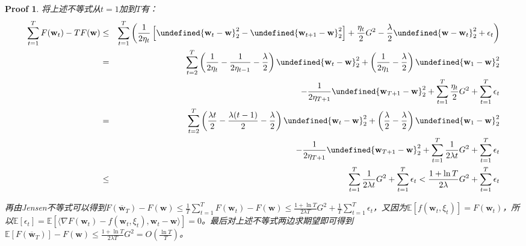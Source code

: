 \documentclass[a4paper,UTF8]{article}
\let\norm\undefined %
\DeclarePairedDelimiter\norm{\lVert}{\rVert}
\numberwithin{equation}{section}
\newtheorem*{myProof}{Proof}
\begin{document}
\begin{myProof}
将上述不等式从$t=1$加到$T$有：
\begin{eqnarray*}
\sum_{t=1}^T F(\mathbf{w}_t) - TF(\mathbf{w}) &\le& \sum_{t=1}^T \left( \frac{1}{2\eta_t} \left[ \norm{\mathbf{w}_t - \mathbf{w}}_2^2 - \norm{\mathbf{w}_{t+1} - \mathbf{w}}_2^2 \right] + \frac{\eta_t}{2} G^2 - \frac{\lambda}{2} \norm{\mathbf{w} - \mathbf{w}_t}_2^2 + \epsilon_t \right) \\
&=& \sum_{t=2}^T \left( \frac{1}{2\eta_t} - \frac{1}{2\eta_{t-1}} - \frac{\lambda}{2} \right) \norm{\mathbf{w}_t - \mathbf{w}}_2^2 + \left( \frac{1}{2\eta_1} - \frac{\lambda}{2} \right) \norm{\mathbf{w}_1 - \mathbf{w}}_2^2 \\
&& - \frac{1}{2\eta_{T+1}}\norm{\mathbf{w}_{T+1} - \mathbf{w}}_2^2 + \sum_{t=1}^T \frac{\eta_t}{2} G^2 + \sum_{t=1}^T \epsilon_t \\
&=&  \sum_{t=2}^T \left( \frac{\lambda t}{2} - \frac{\lambda (t-1)}{2} - \frac{\lambda}{2} \right) \norm{\mathbf{w}_t - \mathbf{w}}_2^2 + \left( \frac{\lambda}{2} - \frac{\lambda}{2} \right) \norm{\mathbf{w}_1 - \mathbf{w}}_2^2 \\
&& - \frac{1}{2\eta_{T+1}}\norm{\mathbf{w}_{T+1} - \mathbf{w}}_2^2 + \sum_{t=1}^T \frac{1}{2\lambda t} G^2 + \sum_{t=1}^T \epsilon_t \\
&\le& \sum_{t=1}^T \frac{1}{2\lambda t} G^2 + \sum_{t=1}^T \epsilon_t < \frac{1 + \ln T}{2\lambda} G^2 + \sum_{t=1}^T \epsilon_t
\end{eqnarray*}

再由Jensen不等式可以得到$F(\overline{\mathbf{w}}_T) - F(\mathbf{w}) \le \frac{1}{T}\sum_{t=1}^T F(\mathbf{w}_t) - F(\mathbf{w}) \le \frac{1 + \ln T}{2\lambda T} G^2 + \frac{1}{T}\sum_{t=1}^T \epsilon_t$，又因为$\mathbb{E}[f(\mathbf{w}_t, \xi_t)] = F(\mathbf{w}_t)$，所以$\mathbb{E}[\epsilon_t] = \mathbb{E}[\langle \nabla F(\mathbf{w}_t) - f(\mathbf{w}_t, \xi_t) , \mathbf{w}_t - \mathbf{w} \rangle] = 0$。最后对上述不等式两边求期望即可得到$\mathbb{E}[F(\overline{\mathbf{w}}_T)] - F(\mathbf{w}) \le \frac{1 + \ln T}{2\lambda T} G^2 = O(\frac{\ln T}{T})$。


\end{myProof}
\end{document}
